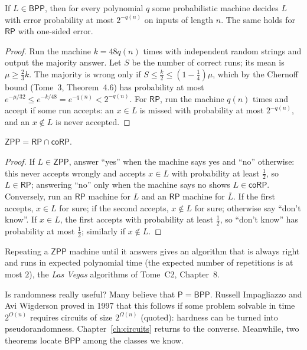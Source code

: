\begin{proposition}\label{prop:amplification}
If $L\in\mathsf{BPP}$, then for every polynomial $q$ some probabilistic machine decides $L$ with error probability at most $2^{-q(n)}$ on inputs of length $n$. The same holds for $\mathsf{RP}$ with one-sided error.
\end{proposition}

\begin{proof}
Run the machine $k=48q(n)$ times with independent random strings and output the majority answer. Let $S$ be the number of correct runs; its mean is $\mu\ge\frac23k$. The majority is wrong only if $S\le\frac k2\le(1-\frac14)\mu$, which by the Chernoff bound (Tome~3, Theorem~4.6) has probability at most $e^{-\mu/32}\le e^{-k/48}=e^{-q(n)}<2^{-q(n)}$. For $\mathsf{RP}$, run the machine $q(n)$ times and accept if some run accepts: an $x\in L$ is missed with probability at most $2^{-q(n)}$, and an $x\notin L$ is never accepted.
\end{proof}

\begin{proposition}\label{prop:zpp}
$\mathsf{ZPP}=\mathsf{RP}\cap\mathsf{coRP}$.
\end{proposition}

\begin{proof}
If $L\in\mathsf{ZPP}$, answer ``yes'' when the machine says yes and ``no'' otherwise: this never accepts wrongly and accepts $x\in L$ with probability at least $\frac12$, so $L\in\mathsf{RP}$; answering ``no'' only when the machine says no shows $L\in\mathsf{coRP}$. Conversely, run an $\mathsf{RP}$ machine for $L$ and an $\mathsf{RP}$ machine for $\bar L$. If the first accepts, $x\in L$ for sure; if the second accepts, $x\notin L$ for sure; otherwise say ``don't know''. If $x\in L$, the first accepts with probability at least $\frac12$, so ``don't know'' has probability at most $\frac12$; similarly if $x\notin L$.
\end{proof}

Repeating a $\mathsf{ZPP}$ machine until it answers gives an algorithm that is always right and runs in expected polynomial time (the expected number of repetitions is at most $2$), the \emph{Las Vegas} algorithms of Tome~C2, Chapter~8.

Is randomness really useful? Many believe that $\mathsf P=\mathsf{BPP}$. Russell Impagliazzo and Avi Wigderson proved in 1997 that this follows if some problem solvable in time $2^{O(n)}$ requires circuits of size $2^{\Omega(n)}$ (quoted): hardness can be turned into pseudorandomness. Chapter~\ref{ch:circuits} returns to the converse. Meanwhile, two theorems locate $\mathsf{BPP}$ among the classes we know.

